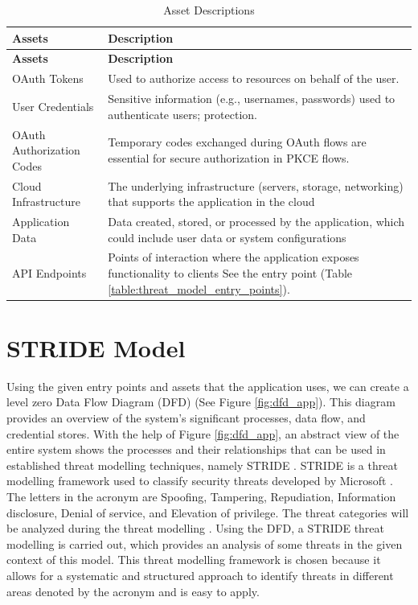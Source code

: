 \begin{longtable}{|p{8cm}|p{8cm}|}
\caption{Asset Descriptions}
\label{table:threat_model_assets}
\hline
\rowcolor{grey!15}
\textbf{Assets} & \textbf{Description} \\
\hline
\endfirsthead

\hline
\rowcolor{grey!15}
\textbf{Assets} & \textbf{Description} \\
\hline
\endhead

OAuth Tokens & Used to authorize access to resources on behalf of the user. \\
\hline
User Credentials & Sensitive information (e.g., usernames, passwords) used to authenticate users; protection. \\
\hline
OAuth Authorization Codes & Temporary codes exchanged during OAuth flows are essential for secure authorization in PKCE flows. \\
\hline
Cloud Infrastructure & The underlying infrastructure (servers, storage, networking) that supports the application in the cloud \\
\hline
Application Data & Data created, stored, or processed by the application, which could include user data or system configurations \\
\hline
API Endpoints & Points of interaction where the application exposes functionality to clients See the entry point (Table \ref{table:threat_model_entry_points}). \\
\hline

\end{longtable}


\section{STRIDE Model}
Using the given entry points and assets that the application uses, we can create a level zero Data Flow Diagram (DFD) (See Figure \ref{fig:dfd_app}). This diagram provides an overview of the system's significant processes, data flow, and credential stores. With the help of Figure \ref{fig:dfd_app}, an abstract view of the entire system shows the processes and their relationships that can be used in established threat modelling techniques, namely STRIDE \citep{dfd_stride}. STRIDE is a threat modelling framework used to classify security threats developed by Microsoft \citep{stride_usage}. The letters in the acronym are Spoofing, Tampering, Repudiation, Information disclosure, Denial of service, and Elevation of privilege. The threat categories will be analyzed during the threat modelling \citep{stride}. Using the DFD, a STRIDE threat modelling is carried out, which provides an analysis of some threats in the given context of this model. This threat modelling framework is chosen because it allows for a systematic and structured approach to identify threats in different areas denoted by the acronym and is easy to apply.



